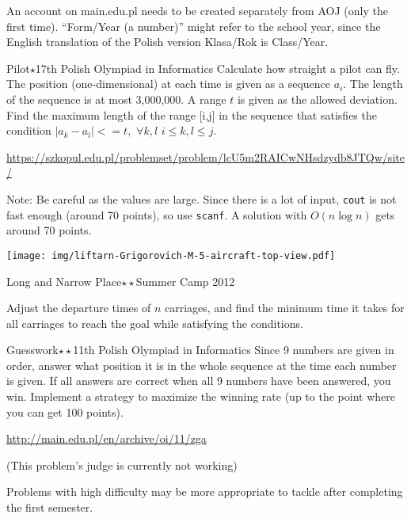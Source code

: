 An account on main.edu.pl needs to be created separately from AOJ (only the first time).
``Form/Year (a number)'' might refer to the school year, since the English translation of the Polish version Klasa/Rok is Class/Year.


\begin{pbox}{Pilot$\star$}{17th Polish Olympiad in Informatics}
Calculate how straight a pilot can fly.
The position (one-dimensional) at each time is given as a sequence $a_i$. The length of the sequence is at most 3,000,000. A range $t$ is given as the allowed deviation. Find the maximum length of the range [i,j] in the sequence that satisfies the condition $|a_k-a_l|<=t,\,\,\forall k,l\,\, i\le k,l \le j$.

\url{https://szkopul.edu.pl/problemset/problem/lcU5m2RAICwNHsdzydb8JTQw/site/}
\end{pbox}

 Note: Be careful as the values are large. Since there is a lot of input, \texttt{cout} is not fast enough (around 70 points), so use \texttt{scanf}. A solution with $O(n\log n)$ gets around 70 points.

\begin{flushright}
\texttt{[image: img/liftarn-Grigorovich-M-5-aircraft-top-view.pdf]}
\end{flushright}
 
\begin{pbox}{Long and Narrow Place$\star\star$}{Summer Camp 2012}
  
Adjust the departure times of $n$ carriages, and find the minimum time it takes for all carriages to reach the goal while satisfying the conditions.

\end{pbox}

\begin{pbox}{Guesswork$\star\star$}{11th Polish Olympiad in Informatics}
  Since 9 numbers are given in order, answer what position it is in the whole sequence at the time each number is given. If all answers are correct when all 9 numbers have been answered, you win. Implement a strategy to maximize the winning rate (up to the point where you can get 100 points).

\url{http://main.edu.pl/en/archive/oi/11/zga}

(This problem's judge is currently not working)
\end{pbox}


Problems with high difficulty may be more appropriate to tackle after completing the first semester.
 
